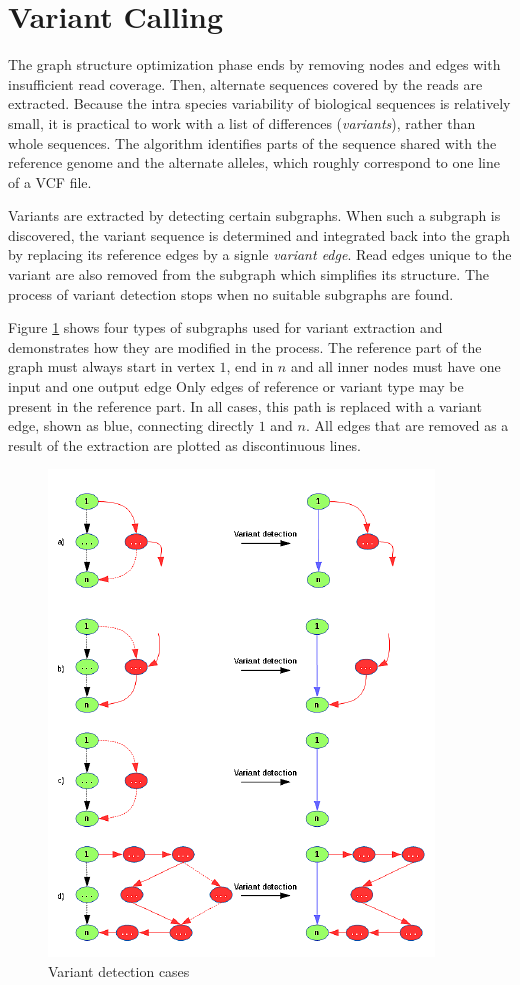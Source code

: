 \section{Variant Calling}
\label{sec:variant-calling}

The graph structure optimization phase ends by removing nodes and edges with insufficient read coverage. Then, alternate sequences covered by the reads are extracted. Because the intra species variability of biological sequences is relatively
small, it is practical to work with a list of differences (\textit{variants}), rather than whole sequences. The algorithm identifies parts of the sequence shared with the reference genome and the alternate alleles, which roughly correspond to one line of a VCF file. 

Variants are extracted by detecting certain subgraphs. When such a subgraph is discovered, the variant sequence is determined and integrated back into the graph by replacing its reference edges by a signle \textit{variant edge}. Read edges unique to the variant are also removed from the subgraph which simplifies its structure. The process of variant detection stops when no suitable subgraphs are found.

Figure \ref{fig:variant-detection} shows four types of subgraphs used for variant extraction and demonstrates how they are modified in the process. The reference part of the graph must always start in vertex $1$, end in $n$ and all inner nodes must have one input and one output edge Only edges of reference or variant type may be present in the reference part. In all cases, this path is replaced with a variant edge, shown as blue, connecting directly $1$ and $n$. All edges that are removed as a result of the extraction are plotted as discontinuous lines.

\begin{figure}[h]
	\centering
	\includegraphics{img/variant-detection.pdf}
	\caption{Variant detection cases}
	\label{fig:variant-detection}
\end{figure}

